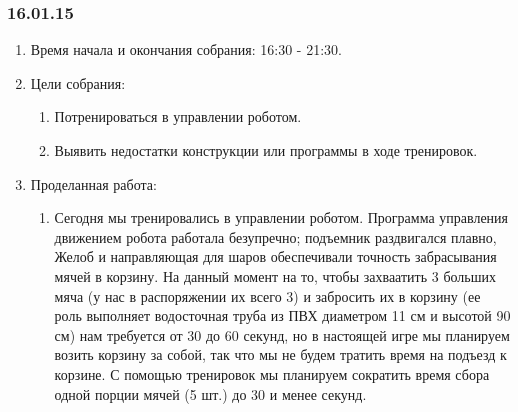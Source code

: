 \subsubsection{16.01.15}
\begin{enumerate}
	
	\item Время начала и окончания собрания: 16:30 - 21:30.
	
	\item Цели собрания: 
	\begin{enumerate}
		
		\item Потренироваться в управлении роботом.
		
		\item Выявить недостатки конструкции или программы в ходе тренировок.
		
	\end{enumerate}

	\item Проделанная работа:
	\begin{enumerate}
		
		\item Сегодня мы тренировались в управлении роботом. Программа управления движением робота работала безупречно; подъемник раздвигался плавно, Желоб и направляющая для шаров обеспечивали точность забрасывания мячей в корзину. На данный момент на то, чтобы захваатить 3 больших мяча (у нас в распоряжении их всего 3) и забросить их в корзину (ее роль выполняет водосточная труба из ПВХ диаметром 11 см и высотой 90 см) нам требуется от 30 до 60 секунд, но в настоящей игре мы планируем возить корзину за собой, так что мы не будем тратить время на подъезд к корзине. С помощью тренировок мы планируем сократить время сбора одной порции мячей (5 шт.) до 30 и менее секунд.
		

\end{enumerate}
\end{enumerate}
